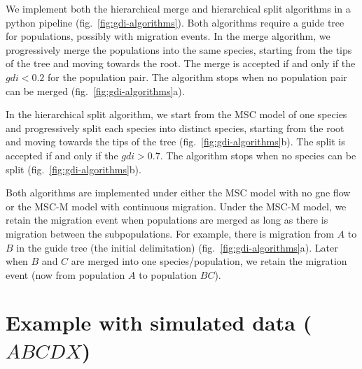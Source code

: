 \documentclass{article1}
\begin{document}
We implement both the hierarchical merge and hierarchical split algorithms in a python
pipeline (fig.~\ref{fig:gdi-algorithms}).  Both algorithms require a guide tree for
populations, possibly with migration events.  In the merge algorithm, we progressively
merge the populations into the same species, starting from the tips of the tree and moving
towards the root.  The merge is accepted if and only if the $gdi < 0.2$ for the
population pair.  The algorithm stops when no population pair can be merged
(fig.~\ref{fig:gdi-algorithms}a).

In the hierarchical split algorithm, we start from the MSC model of one species and
progressively split each species into distinct species, starting from the root and moving
towards the tips of the tree (fig.~\ref{fig:gdi-algorithms}b).  The split is accepted if
and only if the $gdi > 0.7$.  The algorithm stops when no species can be split
(fig.~\ref{fig:gdi-algorithms}b).

Both algorithms are implemented under either the MSC model with no gne flow or the MSC-M
model with continuous migration.  Under the MSC-M model, we retain the migration event
when populations are merged as long as there is migration between the subpopulations.  For
example, there is migration from $A$ to $B$ in the guide tree (the initial delimitation)
(fig.~\ref{fig:gdi-algorithms}a).  Later when $B$ and $C$ are merged into one
species/population, we retain the migration event (now from population $A$ to population
$BC$).

\section{Example with simulated data ($ABCDX$)}
\end{document}
